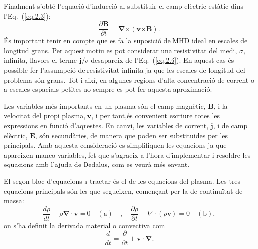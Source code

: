 Finalment s'obté l'equació d'inducció al substituir el camp elèctric estàtic %
dins l'Eq.~(\ref{eq.2.3}):
\begin{equation}
	\frac{\partial \bm{B}}{\partial t} = \bm{\nabla} \bm{\times} (\bm{v} \bm{\times} \bm{B}). \tag{2.7} \label{eq.2.7}
\end{equation}
És important tenir en compte que es fa la suposició de MHD ideal en escales de longitud grans.
Per aquest motiu es pot considerar una resistivitat del medi, $\sigma$,
infinita, llavors el terme $\bm{j}/\sigma$ desapareix de l'Eq.~(\ref{eq.2.6}).
En aquest cas és possible fer l'assumpció de resistivitat infinita ja que les escales de longitud del problema són grans.
Tot i així, en algunes regions d'alta concentració de corrent o a escales espacials petites no sempre es pot fer aquesta aproximació.

Les variables més importants en un plasma són el camp magnètic, $\bm{B}$, i la velocitat del propi plasma, $\bm{v}$,
i per tant,és convenient escriure totes les expressions en funció d'aquestes.
En canvi, les variables de corrent, $\bm{j}$, i de camp elèctric, $\bm{E}$, són secundàries, de manera que poden ser substituides per les principals.
Amb aquesta consideració es simplifiquen les equacions ja que apareixen manco variables, fet que s'agraeix a l'hora d'implementar i resoldre les equacions amb l'ajuda de Dedalus, com es veurà més envant.



El segon bloc d'equacions a tractar és el de les equacions del plasma. Les tres equacions principals són les que segueixen, començant per la de continuïtat de massa:
\begin{equation}
	\frac{d\rho}{dt} + \rho \bm{\nabla} \cdot \bm{v} = 0 \quad (\text{a}) \quad , \quad \frac{\partial \rho}{\partial t} + \nabla \cdot (\rho \bm{v}) = 0 \quad (\text{b}), \tag{2.8} \label{eq.2.8}
\end{equation}
on s'ha definit la derivada material o convectiva com
\begin{equation}
	\frac{d}{dt} = \frac{\partial}{\partial t} + \bm{v} \cdot \bm{\nabla}. \tag{2.9} \label{eq.2.9}
\end{equation}

